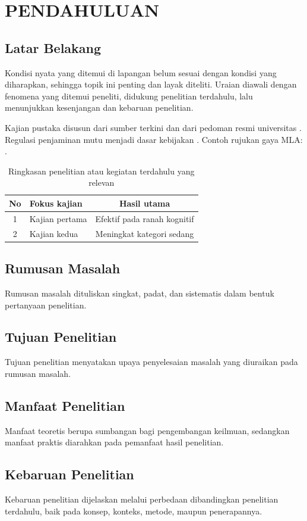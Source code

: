 \chapter{PENDAHULUAN}
\section{Latar Belakang}
Kondisi nyata yang ditemui di lapangan belum sesuai dengan kondisi yang diharapkan, sehingga
topik ini penting dan layak diteliti. Uraian diawali dengan fenomena yang ditemui peneliti,
didukung penelitian terdahulu, lalu menunjukkan kesenjangan dan kebaruan penelitian.

Kajian pustaka disusun dari sumber terkini \citep{creswell2018research, patten2017understanding}
dan dari pedoman resmi universitas \citep{unnes2024panduanakademik}. Regulasi penjaminan mutu
menjadi dasar kebijakan \citep{permendikbudristek2023}.
 Contoh rujukan gaya MLA: .

\begin{table}[htbp]
  \centering
  \caption{Ringkasan penelitian atau kegiatan terdahulu yang relevan}
  \label{tab:terdahulu}
  \begin{tabular}{clc}
    \toprule
    No & Fokus kajian & Hasil utama \\
    \midrule
    1 & Kajian pertama \citep{martin2014write} & Efektif pada ranah kognitif \\
    2 & Kajian kedua \citep{geraldi2017project} & Meningkat kategori sedang \\
    \bottomrule
  \end{tabular}
\end{table}

\section{Rumusan Masalah}
Rumusan masalah dituliskan singkat, padat, dan sistematis dalam bentuk pertanyaan penelitian.

\section{Tujuan Penelitian}
Tujuan penelitian menyatakan upaya penyelesaian masalah yang diuraikan pada rumusan masalah.

\section{Manfaat Penelitian}
Manfaat teoretis berupa sumbangan bagi pengembangan keilmuan, sedangkan manfaat praktis
diarahkan pada pemanfaat hasil penelitian.

\section{Kebaruan Penelitian}
Kebaruan penelitian dijelaskan melalui perbedaan dibandingkan penelitian terdahulu, baik pada
konsep, konteks, metode, maupun penerapannya.
